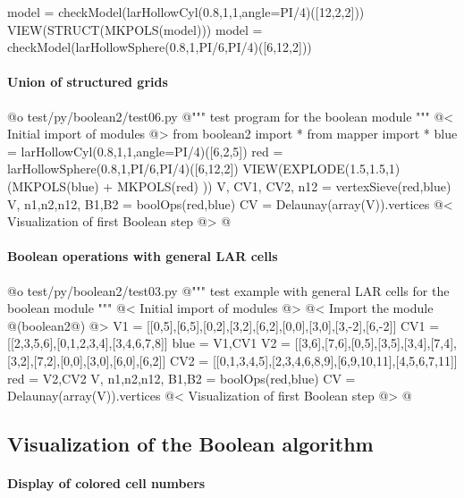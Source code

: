 \documentclass[11pt,oneside]{article}	%
\begin{document}
model = checkModel(larHollowCyl(0.8,1,1,angle=PI/4)([12,2,2]))
VIEW(STRUCT(MKPOLS(model)))
model = checkModel(larHollowSphere(0.8,1,PI/6,PI/4)([6,12,2]))


\paragraph{Union of structured grids}

@o test/py/boolean2/test06.py
@{""" test program for the boolean module """
@< Initial import of modules @>
from boolean2 import *
from mapper import *
blue = larHollowCyl(0.8,1,1,angle=PI/4)([6,2,5])
red = larHollowSphere(0.8,1,PI/6,PI/4)([6,12,2])
VIEW(EXPLODE(1.5,1.5,1)(MKPOLS(blue) + MKPOLS(red) ))
V, CV1, CV2, n12 = vertexSieve(red,blue)
V, n1,n2,n12, B1,B2 = boolOps(red,blue)
CV = Delaunay(array(V)).vertices
@< Visualization of first Boolean step @>
@}





\paragraph{Boolean operations with general LAR cells}

@o test/py/boolean2/test03.py
@{""" test example with general LAR cells for the boolean module """
@< Initial import of modules @>
@< Import the module @(boolean2@) @>
V1 = [[0,5],[6,5],[0,2],[3,2],[6,2],[0,0],[3,0],[3,-2],[6,-2]]
CV1 = [[2,3,5,6],[0,1,2,3,4],[3,4,6,7,8]]
blue = V1,CV1
V2 = [[3,6],[7,6],[0,5],[3,5],[3,4],[7,4],[3,2],[7,2],[0,0],[3,0],[6,0],[6,2]]
CV2 = [[0,1,3,4,5],[2,3,4,6,8,9],[6,9,10,11],[4,5,6,7,11]]
red = V2,CV2
V, n1,n2,n12, B1,B2 = boolOps(red,blue)
CV = Delaunay(array(V)).vertices
@< Visualization of first Boolean step @>
@}

\subsection{Visualization of the Boolean algorithm}

\paragraph{Display of colored cell numbers}
\end{document}
